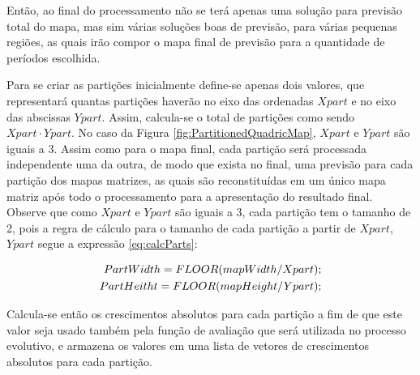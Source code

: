 Então, ao final do processamento não se terá apenas uma solução para previsão  total do mapa, mas sim várias soluções boas de previsão, para várias pequenas regiões, as quais irão compor o mapa final de previsão para a quantidade de períodos escolhida.

Para se criar as partições inicialmente define-se apenas dois valores, que representará quantas partições haverão no eixo das ordenadas \(Xpart\) e no eixo das abscissas \(Ypart\). Assim, calcula-se o total de partições como sendo \(Xpart \cdot Ypart\). No caso da Figura \ref{fig:PartitionedQuadricMap}, \(Xpart\) e \(Ypart\) são iguais a 3. Assim como para o mapa final, cada partição será processada independente uma da outra, de modo que exista no final, uma previsão para cada partição dos mapas matrizes, as quais são reconstituídas em um único mapa matriz após todo o processamento para a apresentação do resultado final. Observe que como \(Xpart\) e \(Ypart\) são iguais a 3, cada partição tem o tamanho de 2, pois a regra de cálculo para o tamanho de cada partição a partir de \(Xpart\), \(Ypart\) segue a expressão \ref{eq:calcParts}:

\begin{equation}
\label{eq:calcParts}
\centering
\begin{split}
PartWidth = FLOOR(mapWidth / Xpart);\\
PartHeitht = FLOOR(mapHeight / Ypart);
\end{split}
\end{equation}

Calcula-se então os crescimentos absolutos para cada partição a fim de que este valor seja usado também pela função de avaliação que será utilizada no processo evolutivo, e armazena os valores em uma lista de vetores de crescimentos absolutos para cada partição. 

